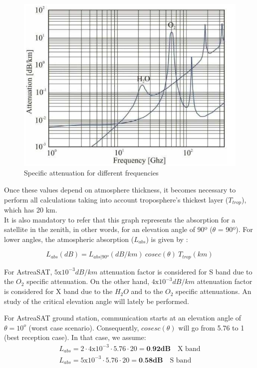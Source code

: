 \begin{figure}[H]
	\includegraphics[scale=0.7]{./sections/SatelliteDept/sections/images/specificAttenuation}
	\centering
	\caption[Specific attenuation for different frequencies]{Specific attenuation for different frequencies \cite{Jorge2012}}
	\label{specificAtenuattion}
\end{figure}

Once these values depend on atmosphere thickness, it becomes necessary to perform all calculations taking into 
account troposphere’s thickest layer ($T_{trop}$), which has 20 km.\\
It is also mandatory to refer that this graph represents the absorption for a satellite in the zenith, in other 
words, for an elevation angle of 90º ($\theta$ = 90º). For lower angles, the atmospheric absorption ($L_{abs}$) is  given by \cite{Jorge2012}:

\begin{equation}
	L_{abs}(dB)=L_{abs|90º} (dB/km)\ cosec(\theta)\ T_{trop}(km)
	\label{Labs}
\end{equation}

For AstreaSAT, $5\mathrm{x}10^{-3}dB/km$ attenuation factor is considered for S band due to the $O_2$ specific attenuation. On the other hand, $4\mathrm{x}10^{-3}dB/km$ attenuation factor is considered for X band due to the $H_2O$ and to the $O_2$ specific attenuations. An study of the critical elevation angle will lately be performed. 

For AstreaSAT ground station, communication starts at an elevation angle of $\theta=10^o$ (worst case scenario). Consequently, $cosesc(\theta)$ will go from 5.76 to 1 (best reception case). In that case, we assume:
\begin{align*}
	L_{abs}=2\cdot4\mathrm{x}10^{-3}\cdot5.76\cdot20 =\textbf{0.92dB} \quad \text{X band}\\
	L_{abs}=5\mathrm{x}10^{-3}\cdot5.76\cdot20 =\textbf{0.58dB} \quad \text{S band}
\end{align*}

